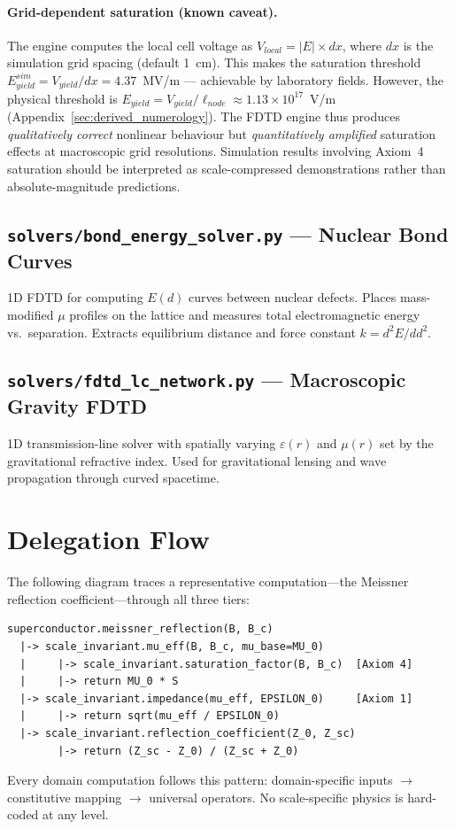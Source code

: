 \paragraph{Grid-dependent saturation (known caveat).}
The engine computes the local cell voltage as $V_{local} = |E| \times dx$, where $dx$ is the simulation grid spacing (default 1~cm).  This makes the saturation threshold $E_{yield}^{sim} = V_{yield}/dx = 4.37$~MV/m --- achievable by laboratory fields.  However, the physical threshold is $E_{yield} = V_{yield}/\ell_{node} \approx 1.13 \times 10^{17}$~V/m (Appendix~\ref{sec:derived_numerology}).  The FDTD engine thus produces \textit{qualitatively correct} nonlinear behaviour but \textit{quantitatively amplified} saturation effects at macroscopic grid resolutions.  Simulation results involving Axiom~4 saturation should be interpreted as scale-compressed demonstrations rather than absolute-magnitude predictions.

\subsection{\texttt{solvers/bond\_energy\_solver.py} --- Nuclear Bond Curves}

1D FDTD for computing $E(d)$ curves between nuclear defects.
Places mass-modified $\mu$ profiles on the lattice and measures
total electromagnetic energy vs.\ separation.  Extracts equilibrium
distance and force constant $k = d^2E/dd^2$.

\subsection{\texttt{solvers/fdtd\_lc\_network.py} --- Macroscopic Gravity FDTD}

1D transmission-line solver with spatially varying $\varepsilon(r)$
and $\mu(r)$ set by the gravitational refractive index.  Used for
gravitational lensing and wave propagation through curved spacetime.


\section{Delegation Flow}

The following diagram traces a representative computation---the
Meissner reflection coefficient---through all three tiers:

\begin{verbatim}
superconductor.meissner_reflection(B, B_c)
  |-> scale_invariant.mu_eff(B, B_c, mu_base=MU_0)
  |     |-> scale_invariant.saturation_factor(B, B_c)  [Axiom 4]
  |     |-> return MU_0 * S
  |-> scale_invariant.impedance(mu_eff, EPSILON_0)     [Axiom 1]
  |     |-> return sqrt(mu_eff / EPSILON_0)
  |-> scale_invariant.reflection_coefficient(Z_0, Z_sc)
        |-> return (Z_sc - Z_0) / (Z_sc + Z_0)
\end{verbatim}

Every domain computation follows this pattern: domain-specific
inputs $\to$ constitutive mapping $\to$ universal operators.
No scale-specific physics is hard-coded at any level.
